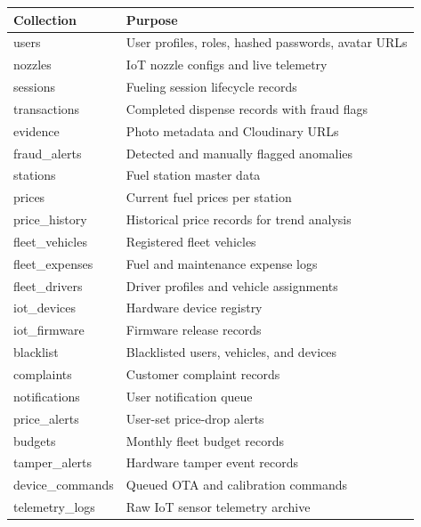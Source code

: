 \documentclass[12pt,a4paper]{article}
\begin{document}
\begin{tabularx}{\linewidth}{>{\ttfamily}l X}
\toprule
Collection        & Purpose \\
\midrule
users             & User profiles, roles, hashed passwords, avatar URLs \\
nozzles           & IoT nozzle configs and live telemetry \\
sessions          & Fueling session lifecycle records \\
transactions      & Completed dispense records with fraud flags \\
evidence          & Photo metadata and Cloudinary URLs \\
fraud\_alerts     & Detected and manually flagged anomalies \\
stations          & Fuel station master data \\
prices            & Current fuel prices per station \\
price\_history    & Historical price records for trend analysis \\
fleet\_vehicles   & Registered fleet vehicles \\
fleet\_expenses   & Fuel and maintenance expense logs \\
fleet\_drivers    & Driver profiles and vehicle assignments \\
iot\_devices      & Hardware device registry \\
iot\_firmware     & Firmware release records \\
blacklist         & Blacklisted users, vehicles, and devices \\
complaints        & Customer complaint records \\
notifications     & User notification queue \\
price\_alerts     & User-set price-drop alerts \\
budgets           & Monthly fleet budget records \\
tamper\_alerts    & Hardware tamper event records \\
device\_commands  & Queued OTA and calibration commands \\
telemetry\_logs   & Raw IoT sensor telemetry archive \\
\bottomrule
\end{tabularx}
\end{document}
